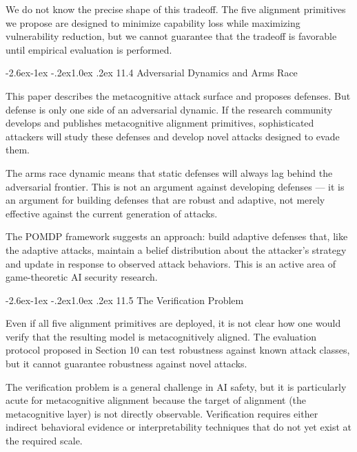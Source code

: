 \documentclass[
  11pt,
]{article}
\makeatletter
\renewcommand\subsection{\@startsection{subsection}{2}{\z@}%
  {-2.6ex\@plus -1ex \@minus -.2ex}{1.0ex \@plus .2ex}%
  {\normalfont\sffamily\large\bfseries}}
\makeatother
\begin{document}
We do not know the precise shape of this tradeoff. The five alignment
primitives we propose are designed to minimize capability loss while
maximizing vulnerability reduction, but we cannot guarantee that the
tradeoff is favorable until empirical evaluation is performed.

\subsection{11.4 Adversarial Dynamics and Arms
Race}\label{adversarial-dynamics-and-arms-race}

This paper describes the metacognitive attack surface and proposes
defenses. But defense is only one side of an adversarial dynamic. If the
research community develops and publishes metacognitive alignment
primitives, sophisticated attackers will study these defenses and
develop novel attacks designed to evade them.

The arms race dynamic means that static defenses will always lag behind
the adversarial frontier. This is not an argument against developing
defenses --- it is an argument for building defenses that are robust and
adaptive, not merely effective against the current generation of
attacks.

The POMDP framework suggests an approach: build adaptive defenses that,
like the adaptive attacks, maintain a belief distribution about the
attacker's strategy and update in response to observed attack behaviors.
This is an active area of game-theoretic AI security research.

\subsection{11.5 The Verification
Problem}\label{the-verification-problem}

Even if all five alignment primitives are deployed, it is not clear how
one would verify that the resulting model is metacognitively aligned.
The evaluation protocol proposed in Section 10 can test robustness
against known attack classes, but it cannot guarantee robustness against
novel attacks.

The verification problem is a general challenge in AI safety, but it is
particularly acute for metacognitive alignment because the target of
alignment (the metacognitive layer) is not directly observable.
Verification requires either indirect behavioral evidence or
interpretability techniques that do not yet exist at the required scale.
\end{document}
